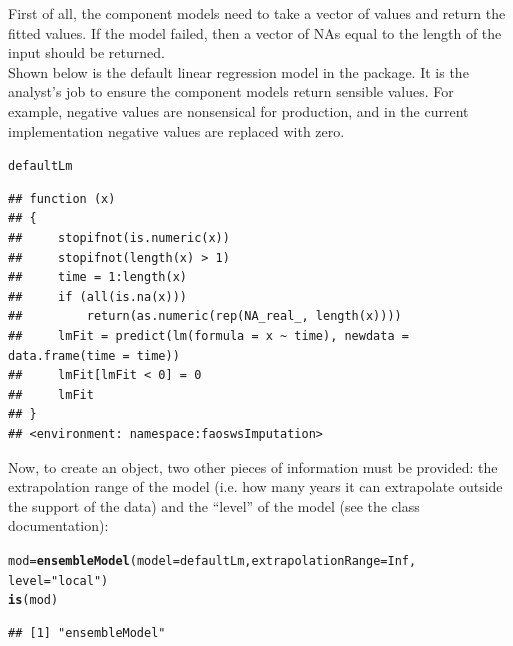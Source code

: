 \documentclass[nojss]{jss}\usepackage[]{graphicx}\usepackage[]{color}
\makeatletter
\newcommand{\hlnum}[1]{\textcolor[rgb]{0.686,0.059,0.569}{#1}}%
\newcommand{\hlstr}[1]{\textcolor[rgb]{0.192,0.494,0.8}{#1}}%
\newcommand{\hlstd}[1]{\textcolor[rgb]{0.345,0.345,0.345}{#1}}%
\newcommand{\hlkwb}[1]{\textcolor[rgb]{0.69,0.353,0.396}{#1}}%
\newcommand{\hlkwc}[1]{\textcolor[rgb]{0.333,0.667,0.333}{#1}}%
\newcommand{\hlkwd}[1]{\textcolor[rgb]{0.737,0.353,0.396}{\textbf{#1}}}%
\newenvironment{kframe}{%
 \def\at@end@of@kframe{}%
 \ifinner\ifhmode%
  \def\at@end@of@kframe{\end{minipage}}%
  \begin{minipage}{\columnwidth}%
 \fi\fi%
 \def\FrameCommand##1{\hskip\@totalleftmargin \hskip-\fboxsep
 \colorbox{shadecolor}{##1}\hskip-\fboxsep
     \hskip-\linewidth \hskip-\@totalleftmargin \hskip\columnwidth}%
 \MakeFramed {\advance\hsize-\width
   \@totalleftmargin\z@ \linewidth\hsize
   \@setminipage}}%
 {\par\unskip\endMakeFramed%
 \at@end@of@kframe}
\newenvironment{knitrout}{}{} %
\makeatother
\begin{document}
First of all, the component models need to take a vector of values and
return the fitted values. If the model failed, then a vector of NAs equal to
the length of the input should be returned.\\

Shown below is the default linear regression model in the package.  It is the
analyst's job to ensure the component models return sensible values. For
example, negative values are nonsensical for production, and in the current
implementation negative values are replaced with zero.

\begin{knitrout}
\color{fgcolor}\begin{kframe}
\begin{alltt}
\hlstd{defaultLm}
\end{alltt}
\begin{verbatim}
## function (x) 
## {
##     stopifnot(is.numeric(x))
##     stopifnot(length(x) > 1)
##     time = 1:length(x)
##     if (all(is.na(x))) 
##         return(as.numeric(rep(NA_real_, length(x))))
##     lmFit = predict(lm(formula = x ~ time), newdata = data.frame(time = time))
##     lmFit[lmFit < 0] = 0
##     lmFit
## }
## <environment: namespace:faoswsImputation>
\end{verbatim}
\end{kframe}
\end{knitrout}

Now, to create an  object, two other pieces of information
must be provided: the extrapolation range of the model (i.e. how many years
it can extrapolate outside the support of the data) and the ``level'' of the
model (see the class documentation):

\begin{knitrout}
\color{fgcolor}\begin{kframe}
\begin{alltt}
\hlstd{mod} \hlkwb{=} \hlkwd{ensembleModel}\hlstd{(}\hlkwc{model} \hlstd{= defaultLm,} \hlkwc{extrapolationRange} \hlstd{=} \hlnum{Inf}\hlstd{,}
                    \hlkwc{level} \hlstd{=} \hlstr{"local"}\hlstd{)}
\hlkwd{is}\hlstd{(mod)}
\end{alltt}
\begin{verbatim}
## [1] "ensembleModel"
\end{verbatim}
\end{kframe}
\end{knitrout}
\end{document}
